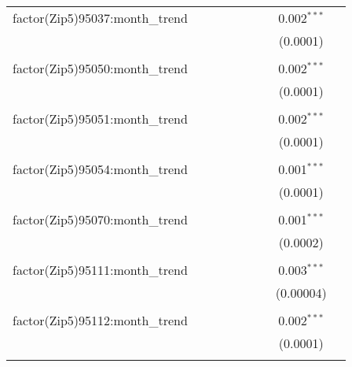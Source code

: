 \begin{table}[H]
{\begin{tabular}{@{\extracolsep{5pt}}lcccccccc}
  factor(Zip5)95037:month\_trend &  &  &  &  &  &  & 0.002$^{***}$ &  \\  

   &  &  &  &  &  &  & (0.0001) &  \\  

   & & & & & & & & \\  

  factor(Zip5)95050:month\_trend &  &  &  &  &  &  & 0.002$^{***}$ &  \\  

   &  &  &  &  &  &  & (0.0001) &  \\  

   & & & & & & & & \\  

  factor(Zip5)95051:month\_trend &  &  &  &  &  &  & 0.002$^{***}$ &  \\  

   &  &  &  &  &  &  & (0.0001) &  \\  

   & & & & & & & & \\  

  factor(Zip5)95054:month\_trend &  &  &  &  &  &  & 0.001$^{***}$ &  \\  

   &  &  &  &  &  &  & (0.0001) &  \\  

   & & & & & & & & \\  

  factor(Zip5)95070:month\_trend &  &  &  &  &  &  & 0.001$^{***}$ &  \\  

   &  &  &  &  &  &  & (0.0002) &  \\  

   & & & & & & & & \\  

  factor(Zip5)95111:month\_trend &  &  &  &  &  &  & 0.003$^{***}$ &  \\  

   &  &  &  &  &  &  & (0.00004) &  \\  

   & & & & & & & & \\  

  factor(Zip5)95112:month\_trend &  &  &  &  &  &  & 0.002$^{***}$ &  \\  

   &  &  &  &  &  &  & (0.0001) &  \\  

   & & & & & & & & \\  


\end{tabular}}
\end{table}
